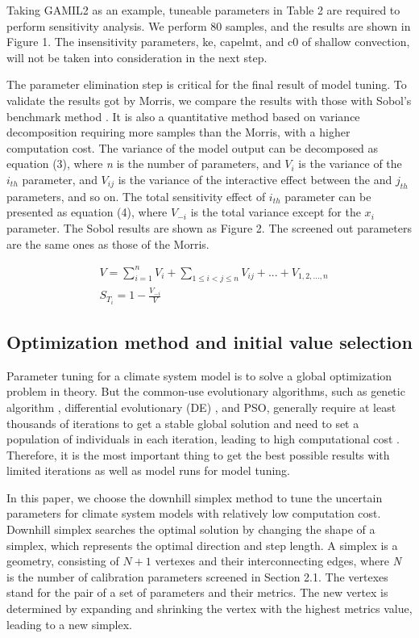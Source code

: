 \documentclass[gmd, manuscript]{copernicus}
\begin{document}
Taking GAMIL2 as an example, tuneable parameters in Table 2 are required to perform sensitivity analysis. We perform 80 samples, and the results are shown in Figure 1. The insensitivity parameters, ke, capelmt, and c0 of shallow convection, will not be taken into consideration in the next step.


The parameter elimination step is critical for the final result of model tuning. To validate the results got by Morris, we compare the results with those with Sobol’s benchmark method \citep{sobol2001global}. It is also a quantitative method based on variance decomposition requiring more samples than the Morris, with a higher computation cost. The variance of the model output can be decomposed as equation (3), where \textit{n} is the number of parameters, and $V_i$ is the variance of the $i_{th}$ parameter, and $V_{ij}$ is the variance of the interactive effect between the  and $j_{th}$ parameters, and so on. The total sensitivity effect of $i_{th}$ parameter can be presented as equation (4), where $V_{-i}$ is the total variance except for the $x_i$ parameter. The Sobol results are shown as Figure 2.  The screened out parameters are the same ones as those of the Morris.

\begin{align}
& V = \sum_{i=1}^n V_i + \sum_{1 \leq i < j \leq n} V_{ij} + ... + V_{1,2,...,n}  \\
& S_{T_i} = 1 - \frac{V_{-i}}{V} 
\end{align}


\subsection{Optimization method and initial value selection}

Parameter tuning for a climate system model is to solve a global optimization problem in theory.  But the common-use evolutionary algorithms, such as genetic algorithm \citep{goldberg1989messy}, differential evolutionary (DE) \citep{storn1995differential}, and PSO, generally require at least  thousands of iterations to get a stable global solution and need to set a population of individuals in each iteration, leading to high computational cost \citep{hegerty2009comparative,shi1999empirical}. Therefore, it is the most important thing to get the best possible results with limited iterations as well as model runs for model tuning.



In this paper, we choose the downhill simplex method to tune the uncertain parameters for climate system models with relatively low computation cost. Downhill simplex searches the optimal solution by changing the shape of a simplex, which represents the optimal direction and step length. A simplex is a geometry, consisting of $N+1$ vertexes and their interconnecting edges, where \textit{N} is the number of calibration parameters screened in Section 2.1. The vertexes stand for the pair of a set of parameters and their metrics. The new vertex is determined by expanding and shrinking the vertex with the highest metrics value, leading to a new simplex.
\end{document}
